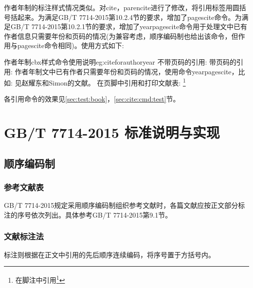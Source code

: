 作者年制的标注样式情况类似。对cite，parencite进行了修改，将引用标签用圆括号括起来。为满足GB/T 7714-2015第10.2.4节的要求，增加了pagescite命令。为满足GB/T 7714-2015第10.2.1节的要求，增加了yearpagescite命令用于处理文中已有作者信息只需要年份和页码的情况(为兼容考虑，顺序编码制也给出该命令，但作用与pagescite命令相同)。使用方式如下:

\begin{codetex}{作者年制cbx样式命令使用说明}{eg:citeforauthoryear}
不带页码的引用:
    \cite{Peebles2001-100-100}  \parencite{Miroslav2004--}
带页码的引用:
    \cite[见][49页]{蔡敏2006--} \parencite[见][49页]{Miroslav2004--}
     
作者年制文中已有作者只需要年份和页码的情况，使用命令yearpagescite，比如:
    见赵耀东和Simon的文献。
在页脚中引用和打印文献表:
    \footnote{在脚注中引用\footcite{赵学功2001--}} 
\end{codetex}

各引用命令的效果见\ref{sec:test:book}，\ref{sec:cite:cmd:test}节。

\section{GB/T 7714-2015 标准说明与实现}

\subsection{顺序编码制}

\subsubsection{参考文献表}\label{sec:bib:serialno}

GB/T 7714-2015规定采用顺序编码制组织参考文献时，各篇文献应按正文部分标注的序号依次列出。具体参考GB/T 7714-2015第9.1节。

\subsubsection{文献标注法}
标注则根据在正文中引用的先后顺序连续编码，将序号置于方括号内。


